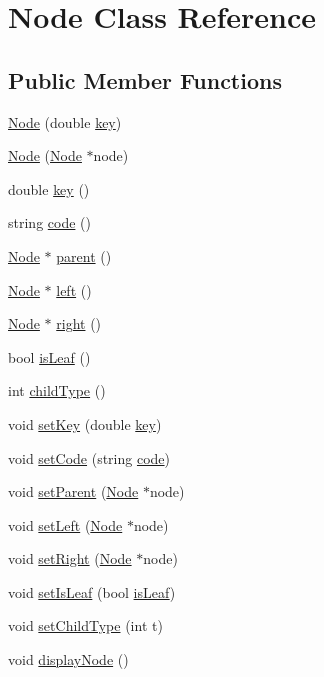 \hypertarget{class_node}{}\section{Node Class Reference}
\label{class_node}
\subsection*{Public Member Functions}
\begin{DoxyCompactItemize}
\item 
\hyperlink{class_node_a05d6f0c7481e95275891b39772bbee3c}{Node} (double \hyperlink{class_node_ac3839181a45989c15b1fe653e1fc0e45}{key})
\item 
\hyperlink{class_node_aa7fd5e925d4064dfa1c1da07b63e16f9}{Node} (\hyperlink{class_node}{Node} $\ast$node)
\item 
double \hyperlink{class_node_ac3839181a45989c15b1fe653e1fc0e45}{key} ()
\item 
string \hyperlink{class_node_a322a8a4feeb712269cbc67535a423c22}{code} ()
\item 
\hyperlink{class_node}{Node} $\ast$ \hyperlink{class_node_a2439f542fb5d8d139410a11c2b44108c}{parent} ()
\item 
\hyperlink{class_node}{Node} $\ast$ \hyperlink{class_node_ad031d8d72c886dbd725ce1fa5f818a0c}{left} ()
\item 
\hyperlink{class_node}{Node} $\ast$ \hyperlink{class_node_af1536e5315807b7ae6dad94d6eded071}{right} ()
\item 
bool \hyperlink{class_node_a3a61dca67d5ad06cacb8c48eb6374973}{is\+Leaf} ()
\item 
int \hyperlink{class_node_ad1ca5b14ac5224950532e25b41ae2e60}{child\+Type} ()
\item 
void \hyperlink{class_node_ad0a0e7086282240633cca8ef12929343}{set\+Key} (double \hyperlink{class_node_ac3839181a45989c15b1fe653e1fc0e45}{key})
\item 
void \hyperlink{class_node_af7a2472710ee20810344c8f84b9bb501}{set\+Code} (string \hyperlink{class_node_a322a8a4feeb712269cbc67535a423c22}{code})
\item 
void \hyperlink{class_node_a83f9394751abbb2b454d85f088a75b2c}{set\+Parent} (\hyperlink{class_node}{Node} $\ast$node)
\item 
void \hyperlink{class_node_a17dc627cf612396a6a3ae9cdf23851c3}{set\+Left} (\hyperlink{class_node}{Node} $\ast$node)
\item 
void \hyperlink{class_node_a314d08e224f41a6ebef84e990c195844}{set\+Right} (\hyperlink{class_node}{Node} $\ast$node)
\item 
void \hyperlink{class_node_a05195109026bd2dc45d9bb6d98fa47af}{set\+Is\+Leaf} (bool \hyperlink{class_node_a3a61dca67d5ad06cacb8c48eb6374973}{is\+Leaf})
\item 
void \hyperlink{class_node_aec6ddee44bb9b9f60ee6e99c243651b9}{set\+Child\+Type} (int t)
\item 
void \hyperlink{class_node_a96a8dec047cf24af043e7ca8ccfcea3d}{display\+Node} ()
\end{DoxyCompactItemize}
